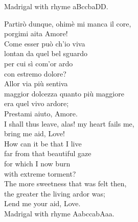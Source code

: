 \documentclass[12pt, twocolumn]{text-translation}
\begin{document}
Madrigal with rhyme aBccbaDD.

Partirò dunque, ohimè mi manca il core,  \\
porgimi aita Amore! \\
Come esser può ch'io viva \\
lontan da quel bel sguardo \\
per cui sì com'or ardo \\
con estremo dolore? \\
Allor via più sentiva  \\
maggior dolcezza quanto più maggiore \\
era quel vivo ardore;  \\
Prestami aiuto, Amore. \\
\poemasterisks
I shall thus leave, alas! my heart fails me, \\
bring me aid, Love! \\
How can it be that I live \\
far from that beautiful gaze \\
for which I now burn \\
with extreme torment?  \\
The more sweetness that was felt then, \\
the greater the living ardor was; \\
Lend me your aid, Love.  \\

Madrigal with rhyme AabccabAaa.
\end{document}
